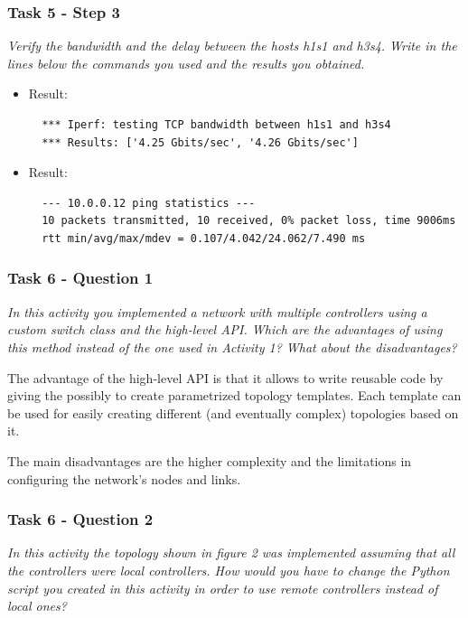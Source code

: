 \subsubsection*{Task 5 - Step 3}
\textit{Verify the bandwidth and the delay between the hosts h1s1 and h3s4. Write
in the lines below the commands you used and the results you obtained.}
\begin{itemize}
  \item {}

  Result:
  \begin{lstlisting}
  *** Iperf: testing TCP bandwidth between h1s1 and h3s4
  *** Results: ['4.25 Gbits/sec', '4.26 Gbits/sec']
  \end{lstlisting}

  \item {}

  Result:
  \begin{lstlisting}
  --- 10.0.0.12 ping statistics ---
  10 packets transmitted, 10 received, 0% packet loss, time 9006ms
  rtt min/avg/max/mdev = 0.107/4.042/24.062/7.490 ms
  \end{lstlisting}
\end{itemize}




\subsubsection*{Task 6 - Question 1}
\textit{In this activity you implemented a network with multiple controllers using
a custom switch class and the high-level API. Which are the advantages of using
this method instead of the one used in Activity 1? What about the disadvantages?}

The advantage of the high-level API is that it allows to write reusable code by
giving the possibly to create parametrized topology templates. Each template can
be used for easily creating different (and eventually complex) topologies based on it.

The main disadvantages are the higher complexity and the limitations in configuring
the network's nodes and links.
\subsubsection*{Task 6 - Question 2}
\textit{In this activity the topology shown in figure 2 was implemented
assuming that all the controllers were local controllers. How would
you have to change the Python script you created in this activity
in order to use remote controllers instead of local ones?}

